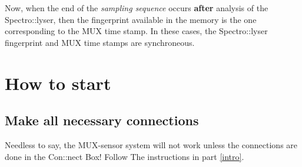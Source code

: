 \documentclass[]{book}
\begin{document}
Now, when the end of the \emph{sampling sequence} occurs \textbf{after} analysis of the Spectro::lyser, then the fingerprint available in the memory is the one corresponding to the MUX time stamp. In these cases, the Spectro::lyser fingerprint and MUX time stamps are synchroneous.

\hypertarget{how-to-start-1}{%
\chapter{How to start}\label{how-to-start-1}}

\hypertarget{make-all-necessary-connections}{%
\section{Make all necessary connections}\label{make-all-necessary-connections}}

Needless to say, the MUX-sensor system will not work unless the connections are done in the Con::nect Box! Follow The instructions in part \ref{intro}.

\hypertarget{section}{%
\section{}\label{section}}


\end{document}
